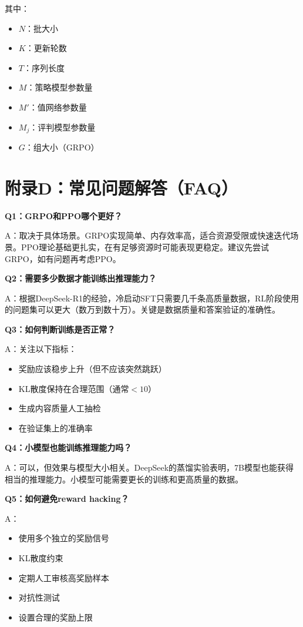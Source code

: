 \documentclass[12pt,a4paper]{article}
\begin{document}
其中：
\begin{itemize}
    \item $N$：批大小
    \item $K$：更新轮数
    \item $T$：序列长度
    \item $M$：策略模型参数量
    \item $M'$：值网络参数量
    \item $M_j$：评判模型参数量
    \item $G$：组大小（GRPO）
\end{itemize}

\section*{附录D：常见问题解答（FAQ）}

\textbf{Q1：GRPO和PPO哪个更好？}

A：取决于具体场景。GRPO实现简单、内存效率高，适合资源受限或快速迭代场景。PPO理论基础更扎实，在有足够资源时可能表现更稳定。建议先尝试GRPO，如有问题再考虑PPO。

\textbf{Q2：需要多少数据才能训练出推理能力？}

A：根据DeepSeek-R1的经验，冷启动SFT只需要几千条高质量数据，RL阶段使用的问题集可以更大（数万到数十万）。关键是数据质量和答案验证的准确性。

\textbf{Q3：如何判断训练是否正常？}

A：关注以下指标：
\begin{itemize}
    \item 奖励应该稳步上升（但不应该突然跳跃）
    \item KL散度保持在合理范围（通常$<10$）
    \item 生成内容质量人工抽检
    \item 在验证集上的准确率
\end{itemize}

\textbf{Q4：小模型也能训练推理能力吗？}

A：可以，但效果与模型大小相关。DeepSeek的蒸馏实验表明，7B模型也能获得相当的推理能力。小模型可能需要更长的训练和更高质量的数据。

\textbf{Q5：如何避免reward hacking？}

A：
\begin{itemize}
    \item 使用多个独立的奖励信号
    \item KL散度约束
    \item 定期人工审核高奖励样本
    \item 对抗性测试
    \item 设置合理的奖励上限
\end{itemize}
\end{document}
